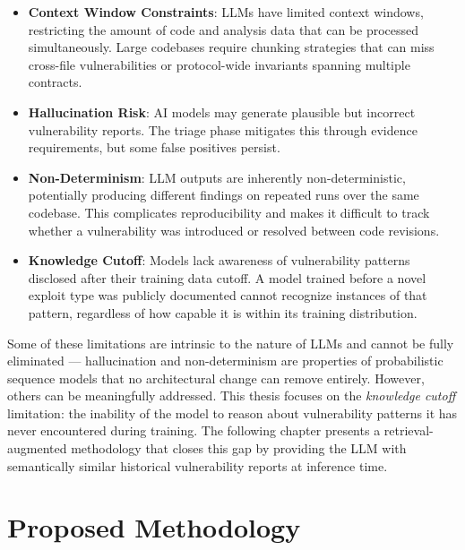 \begin{itemize}
    \item \textbf{Context Window Constraints}: LLMs have limited context windows, restricting the amount of code and analysis data that can be processed simultaneously. Large codebases require chunking strategies that can miss cross-file vulnerabilities or protocol-wide invariants spanning multiple contracts.

    \item \textbf{Hallucination Risk}: AI models may generate plausible but incorrect vulnerability reports. The triage phase mitigates this through evidence requirements, but some false positives persist.

    \item \textbf{Non-Determinism}: LLM outputs are inherently non-deterministic, potentially producing different findings on repeated runs over the same codebase. This complicates reproducibility and makes it difficult to track whether a vulnerability was introduced or resolved between code revisions.

    \item \textbf{Knowledge Cutoff}: Models lack awareness of vulnerability patterns disclosed after their training data cutoff. A model trained before a novel exploit type was publicly documented cannot recognize instances of that pattern, regardless of how capable it is within its training distribution.
\end{itemize}

Some of these limitations are intrinsic to the nature of LLMs and cannot be fully eliminated --- hallucination and non-determinism are properties of probabilistic sequence models that no architectural change can remove entirely. However, others can be meaningfully addressed. This thesis focuses on the \emph{knowledge cutoff} limitation: the inability of the model to reason about vulnerability patterns it has never encountered during training. The following chapter presents a retrieval-augmented methodology that closes this gap by providing the LLM with semantically similar historical vulnerability reports at inference time.


\chapter{Proposed Methodology}
\label{ch:methodology}

